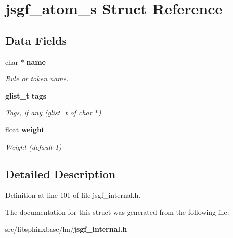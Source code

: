 \section{jsgf\-\_\-atom\-\_\-s \-Struct \-Reference}
\label{structjsgf__atom__s}
\subsection*{\-Data \-Fields}
\begin{DoxyCompactItemize}
\item 
char $\ast$ {\bf name}\label{structjsgf__atom__s_ac7473e48f49258c5e5ef65bbb669b19e}

\begin{DoxyCompactList}\small\item\em \-Rule or token name. \end{DoxyCompactList}\item 
{\bf glist\-\_\-t} {\bf tags}\label{structjsgf__atom__s_a4ecab128d84fd748efe52e338e7e2ecb}

\begin{DoxyCompactList}\small\item\em \-Tags, if any (glist\-\_\-t of char $\ast$) \end{DoxyCompactList}\item 
float {\bf weight}\label{structjsgf__atom__s_a50672ba6d1e24c55bf8b58b97114effa}

\begin{DoxyCompactList}\small\item\em \-Weight (default 1) \end{DoxyCompactList}\end{DoxyCompactItemize}


\subsection{\-Detailed \-Description}


\-Definition at line 101 of file jsgf\-\_\-internal.\-h.



\-The documentation for this struct was generated from the following file\-:\begin{DoxyCompactItemize}
\item 
src/libsphinxbase/lm/{\bf jsgf\-\_\-internal.\-h}\end{DoxyCompactItemize}
